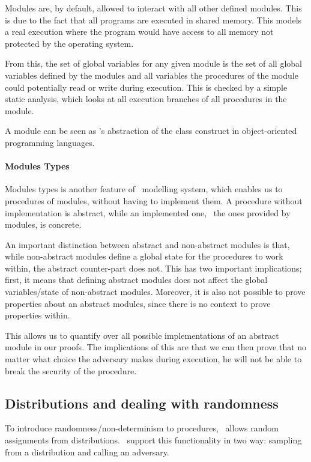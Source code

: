 Modules are, by default, allowed to interact with all other defined modules.
This is due to the fact that all programs are executed in shared memory. This
models a real execution where the program would have access to
all memory not protected by the operating system.

From this, the set of global variables for any given module is the set of all
global variables defined by the modules and all variables the procedures of the module
could potentially read or write during execution. This is checked by a simple
static analysis, which looks at all execution branches of all procedures in the module.

A module can be seen as \easycrypt's abstraction of the class construct
in object-oriented programming languages.

\paragraph{Modules Types}
\label{sec:ec_module_types}
Modules types is another feature of \easycrypt\ modelling system, which
enables us to procedures of modules, without having to implement
them. A procedure without implementation is abstract, while
an implemented one, \ie\ the ones provided by modules, is concrete.

An important distinction between abstract and non-abstract modules is that,
while non-abstract modules define a global state for the procedures to work
within, the abstract counter-part does not. This has two important implications;
first, it means that defining abstract modules does not affect the global
variables/state of non-abstract modules.
Moreover, it is also not possible to prove properties about an abstract modules, since
there is no context to prove properties within.

This allows us to quantify over all possible implementations of an abstract
module in our proofs.
The implications of this are that we can then prove that no matter what choice
the adversary makes during execution, he will not be able to break the security
of the procedure.

\subsection{Distributions and dealing with randomness}
\label{sec:easycrypt:distributions}
To introduce randomness/non-determinism to procedures, \easycrypt\ allows
random assignments from distributions. \easycrypt\ support this functionality in
two way: sampling from a distribution and calling an adversary.


